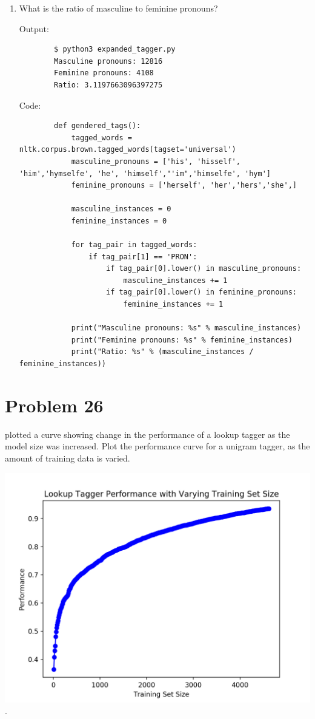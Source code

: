 \documentclass[12pt]{article}
\begin{document}
\begin{enumerate}
		\item What is the ratio of masculine to feminine pronouns?
		
		Output:
		\begin{lstlisting}
		$ python3 expanded_tagger.py
		Masculine pronouns: 12816
		Feminine pronouns: 4108
		Ratio: 3.1197663096397275
		\end{lstlisting}
		
		Code:
		\begin{lstlisting}
		def gendered_tags():
			tagged_words = nltk.corpus.brown.tagged_words(tagset='universal')
			masculine_pronouns = ['his', 'hisself',  'him','hymselfe', 'he', 'himself',"'im",'himselfe', 'hym']
			feminine_pronouns = ['herself', 'her','hers','she',]
			
			masculine_instances = 0
			feminine_instances = 0
			
			for tag_pair in tagged_words:
				if tag_pair[1] == 'PRON':
					if tag_pair[0].lower() in masculine_pronouns:
						masculine_instances += 1
					if tag_pair[0].lower() in feminine_pronouns:
						feminine_instances += 1
			
			print("Masculine pronouns: %s" % masculine_instances)
			print("Feminine pronouns: %s" % feminine_instances)
			print("Ratio: %s" % (masculine_instances / feminine_instances))
		\end{lstlisting}
		
	\end{enumerate}
	
	
	\section*{Problem 26}
	  plotted a curve showing change in the performance of a lookup tagger as the model size was increased. Plot the performance curve for a unigram tagger, as the amount of training data is varied.
	 
	 \includegraphics[scale=1.0]{Figure_1.png}.
	 
\end{document}
